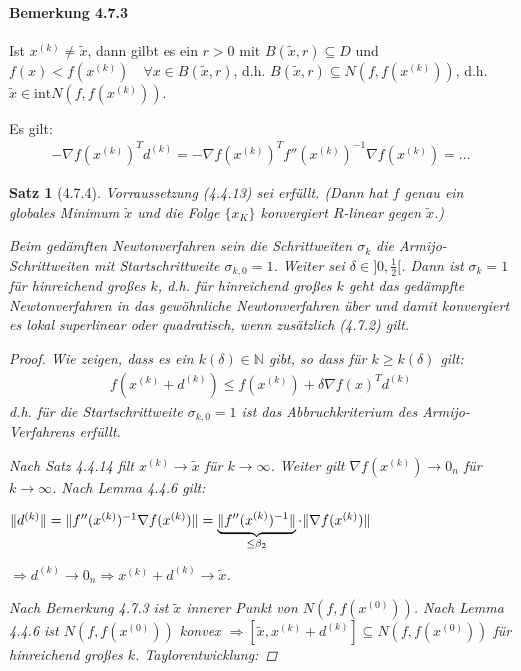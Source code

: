 \documentclass[ngerman,halfparskip]{scrartcl}
\DeclarePairedDelimiter{\norm}{\lVert}{\rVert}
\newtheorem*{satz}{Satz}
\theoremstyle{definition}
\newcommand*{\N}{\mathbb{N}}      %
\begin{document}
\paragraph{Bemerkung 4.7.3} Ist $x^{(k)}\neq \tilde x$, dann gilbt es ein $r>0$ mit $B(\tilde x, r)\subseteq D$ und $f(x)<f(x^{(k)})\quad \forall x\in B(\tilde x, r)$, d.h. $B(\tilde x, r)\subseteq N(f,f(x^{(k)}))$, d.h. $\tilde x\in \text{int}N(f,f(x^{(k)}))$.

Es gilt:
\begin{gather*}\tag{4.7.3}
-\nabla f(x^{(k)})^Td^{(k)}=-\nabla f(x^{(k)})^T f''(x^{(k)})^{-1}\nabla f(x^{(k)})=...
\end{gather*}

\begin{satz}[4.7.4]
Vorraussetzung (4.4.13) sei erfüllt. (Dann hat $f$ genau ein globales Minimum $\tilde x$ und die Folge $\{x_K\}$ konvergiert $R$-linear gegen $\tilde x$.)

Beim gedämften Newtonverfahren sein die Schrittweiten $\sigma_k$ die Armijo-Schrittweiten mit Startschrittweite $\sigma_{k,0}=1$. Weiter sei $\delta\in]0,\frac 12[$. Dann ist $\sigma_k=1$ für hinreichend großes $k$, d.h. für hinreichend großes $k$ geht das gedämpfte Newtonverfahren in das gewöhnliche Newtonverfahren über und damit konvergiert es lokal superlinear oder quadratisch, wenn zusätzlich (4.7.2) gilt.

\begin{proof}
Wie zeigen, dass es ein $k(\delta)\in\N$ gibt, so dass für $k\geq k(\delta)$ gilt:
\begin{gather*}\tag{1}
f(x^{(k)}+d^{(k)})\leq f(x^{(k)})+\delta \nabla f(x)^Td^{(k)}
\end{gather*}
 d.h. für die Startschrittweite $\sigma_{k,0}=1$ ist das Abbruchkriterium des Armijo-Verfahrens erfüllt.
 
 Nach Satz 4.4.14 filt $x^{(k)}\rightarrow \tilde x$ für $k\rightarrow \infty$. Weiter gilt $\nabla f (x^{(k)})\rightarrow 0_n$ für $k\rightarrow \infty$. Nach Lemma  4.4.6 gilt:
 
 $\norm{d^{(k)}}=\norm{f''(x^{(k)})^{-1}\nabla f (x^{(k)})}=\underbrace{\norm{f''(x^{(k)})^{-1}}}_{\leq \beta_2}\cdot \norm{\nabla f (x^{(k)})}$
 
 $\Rightarrow d^{(k)}\rightarrow 0_n \Rightarrow x^{(k)}+d^{(k)}\rightarrow \tilde x$.
 
 Nach Bemerkung 4.7.3 ist $\tilde x$ innerer Punkt von $N(f,f(x^{(0)}))$. Nach Lemma 4.4.6 ist $N(f,f(x^{(0)}))$ konvex $\Rightarrow [\tilde x,x^{(k)}+d^{(k)} ]\subseteq N(f,f(x^{(0)}))$ für hinreichend großes $k$. Taylorentwicklung:
 

\end{proof}
\end{satz}
\end{document}
